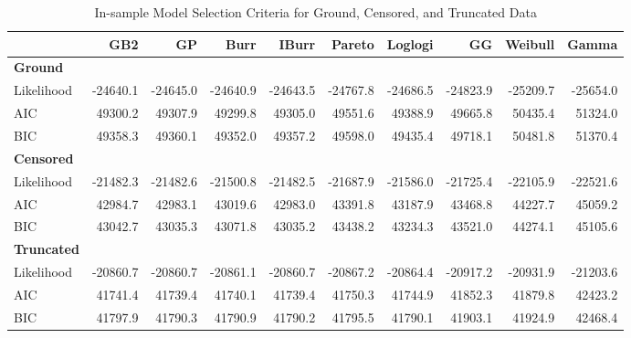 \begin{table}[h!]
\renewcommand{\tabcolsep}{2mm}
\renewcommand{\arraystretch}{0.75}
\centering
\footnotesize
\begin{tabular}{lrrrrrrrrr}
\toprule
& \textbf{GB2} & \textbf{GP} & \textbf{Burr} & \textbf{IBurr} & \textbf{Pareto} & \textbf{Loglogi} & \textbf{GG} & \textbf{Weibull} & \textbf{Gamma} \\
\midrule
\textbf{Ground} \\
Likelihood & -24640.1 & -24645.0 & -24640.9 & -24643.5 & -24767.8 & -24686.5 & -24823.9 & -25209.7 & -25654.0 \\
AIC & 49300.2 & 49307.9 & 49299.8 & 49305.0 & 49551.6 & 49388.9 & 49665.8 & 50435.4 & 51324.0 \\
BIC & 49358.3 & 49360.1 & 49352.0 & 49357.2 & 49598.0 & 49435.4 & 49718.1 & 50481.8 & 51370.4 \\
\midrule
\textbf{Censored} \\
Likelihood & -21482.3 & -21482.6 & -21500.8 & -21482.5 & -21687.9 & -21586.0 & -21725.4 & -22105.9 & -22521.6 \\
AIC & 42984.7 & 42983.1 & 43019.6 & 42983.0 & 43391.8 & 43187.9 & 43468.8 & 44227.7 & 45059.2 \\
BIC & 43042.7 & 43035.3 & 43071.8 & 43035.2 & 43438.2 & 43234.3 & 43521.0 & 44274.1 & 45105.6 \\
\midrule
\textbf{Truncated} \\
Likelihood & -20860.7 & -20860.7 & -20861.1 & -20860.7 & -20867.2 & -20864.4 & -20917.2 & -20931.9 & -21203.6 \\
AIC & 41741.4 & 41739.4 & 41740.1 & 41739.4 & 41750.3 & 41744.9 & 41852.3 & 41879.8 & 42423.2 \\
BIC & 41797.9 & 41790.3 & 41790.9 & 41790.2 & 41795.5 & 41790.1 & 41903.1 & 41924.9 & 42468.4 \\
\bottomrule
\end{tabular}
\caption{In-sample Model Selection Criteria for Ground, Censored, and Truncated Data}
\label{tab:model_comparison}
\end{table}
